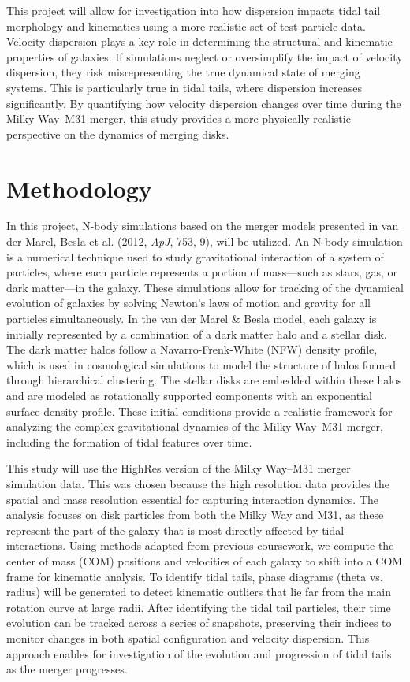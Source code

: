 \documentclass[fleqn,usenatbib]{mnras}
\begin{document}
This project will allow for investigation into how dispersion impacts tidal tail morphology and kinematics using a more realistic set of test-particle data.  Velocity dispersion plays a key role in determining the structural and kinematic properties of galaxies. If simulations neglect or oversimplify the impact of velocity dispersion, they risk misrepresenting the true dynamical state of merging systems. This is particularly true in tidal tails, where dispersion increases significantly. By quantifying how velocity dispersion changes over time during the Milky Way–M31 merger, this study provides a more physically realistic perspective on the dynamics of merging disks. 


\section{Methodology}

In this project, N-body simulations based on the merger models presented in van der Marel, Besla et al. (2012, \textit{ApJ}, 753, 9), will be utilized. An N-body simulation is a numerical technique used to study gravitational interaction of a system of particles, where each particle represents a portion of mass—such as stars, gas, or dark matter—in the galaxy. These simulations allow for tracking of the dynamical evolution of galaxies by solving Newton’s laws of motion and gravity for all particles simultaneously. In the van der Marel \& Besla model, each galaxy is initially represented by a combination of a dark matter halo and a stellar disk. The dark matter halos follow a Navarro-Frenk-White (NFW) density profile, which is used in cosmological simulations to model the structure of halos formed through hierarchical clustering. The stellar disks are embedded within these halos and are modeled as rotationally supported components with an exponential surface density profile. These initial conditions provide a realistic framework for analyzing the complex gravitational dynamics of the Milky Way–M31 merger, including the formation of tidal features over time.

This study will use the HighRes version of the Milky Way–M31 merger simulation data. This was chosen because the high resolution data provides the spatial and mass resolution essential for capturing interaction dynamics. The analysis focuses on disk particles from both the Milky Way and M31, as these represent the part of the galaxy that is most directly affected by tidal interactions. Using methods adapted from previous coursework, we compute the center of mass (COM) positions and velocities of each galaxy to shift into a COM frame for kinematic analysis. To identify tidal tails, phase diagrams  (theta vs. radius) will be generated to detect kinematic outliers that lie far from the main rotation curve at large radii. After identifying the tidal tail particles,  their time evolution can be tracked across a series of snapshots, preserving their indices to monitor changes in both spatial configuration and velocity dispersion. This approach enables for investigation of the evolution and progression of tidal tails as the merger progresses.
\end{document}
